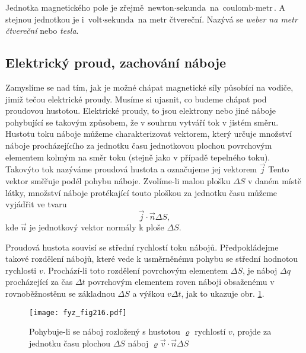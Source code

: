     Jednotka magnetického pole je zřejmě \(\text{newton}\cdot\text{sekunda}\) na \(\text{coulomb} 
    \cdot \text{metr}\). A stejnou jednotkou je i \(\text{volt}\cdot\text{sekunda}\) na metr 
    čtvereční. Nazývá se \emph{weber na metr čtvereční} nebo \emph{tesla}.

    \subsection{Elektrický proud, zachování náboje}
      \cite[s.~225]{Feynman02} Zamyslíme se nad tím, jak je možné chápat magnetické síly působící 
      na vodiče, jimiž tečou elektrické proudy. Musíme si ujasnit, co budeme chápat pod proudovou 
      hustotou. Elektrické proudy, to jsou elektrony nebo jiné náboje pohybující se takovým 
      způsobem, že v souhrnu vytváří tok v jistém směru. Hustotu toku náboje můžeme charakterizovat 
      vektorem, který určuje množství náboje procházejícího za jednotku času jednotkovou plochou 
      povrchovým elementem kolmým na směr toku (stejně jako v případě tepelného toku). Takovýto tok 
      nazýváme proudová hustota a označujeme jej vektorem \(\vec{j}\) Tento vektor směřuje podél 
      pohybu náboje. Zvolíme-li malou plošku \(\Delta S\) v daném místě látky, množství náboje 
      protékající touto ploškou za jednotku času můžeme vyjádřit ve tvaru
      \begin{equation}\label{eq_fyz:mag001}
        \vec{j}\cdot\vec{n}\Delta S,
      \end{equation} 
      kde \(\vec{n}\) je jednotkový vektor normály k ploše \(\Delta S\).
      
      Proudová hustota souvisí se střední rychlostí toku nábojů. Předpokládejme takové rozdělení 
      nábojů, které vede k usměrněnému pohybu se střední hodnotou rychlosti \(v\). Prochází-li 
      toto rozdělení povrchovým elementem \(\Delta S\), je náboj \(\Delta q\) procházející za čas 
      \(\Delta t\) povrchovým elementem roven náboji obsaženému v rovnoběžnostěnu se základnou 
      \(\Delta S\) a výškou \(v\Delta t\), jak to ukazuje obr. \ref{fyz:fig216}.
      \begin{figure}[ht!]
        \centering
        \texttt{[image: fyz\_fig216.pdf]}
        \caption{Pohybuje-li se náboj rozložený s hustotou \(\varrho\) rychlostí \(v\), projde za 
        jednotku času plochou \(\Delta S\) náboj \(\varrho\vec{v}\cdot\vec{n}\Delta S\)}
        \label{fyz:fig216} 
      \end{figure}
      
